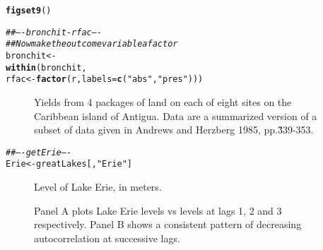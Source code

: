 \documentclass[12pt, a4paper,  BCOR=8.25mm, DIV=15]{scrartcl}\usepackage[]{graphicx}\usepackage[]{color}
\makeatletter
\newcommand{\hlstr}[1]{\textcolor[rgb]{0.192,0.494,0.8}{#1}}%
\newcommand{\hlcom}[1]{\textcolor[rgb]{0.678,0.584,0.686}{\textit{#1}}}%
\newcommand{\hlstd}[1]{\textcolor[rgb]{0.345,0.345,0.345}{#1}}%
\newcommand{\hlkwb}[1]{\textcolor[rgb]{0.69,0.353,0.396}{#1}}%
\newcommand{\hlkwc}[1]{\textcolor[rgb]{0.333,0.667,0.333}{#1}}%
\newcommand{\hlkwd}[1]{\textcolor[rgb]{0.737,0.353,0.396}{\textbf{#1}}}%
\newenvironment{kframe}{%
 \def\at@end@of@kframe{}%
 \ifinner\ifhmode%
  \def\at@end@of@kframe{\end{minipage}}%
  \begin{minipage}{\columnwidth}%
 \fi\fi%
 \def\FrameCommand##1{\hskip\@totalleftmargin \hskip-\fboxsep
 \colorbox{shadecolor}{##1}\hskip-\fboxsep
     \hskip-\linewidth \hskip-\@totalleftmargin \hskip\columnwidth}%
 \MakeFramed {\advance\hsize-\width
   \@totalleftmargin\z@ \linewidth\hsize
   \@setminipage}}%
 {\par\unskip\endMakeFramed%
 \at@end@of@kframe}
\newenvironment{knitrout}{}{} %
\makeatother
\begin{document}
\begin{knitrout}
\color{fgcolor}\begin{kframe}
\begin{alltt}
\hlkwd{figset9}\hlstd{()}
\end{alltt}


{\ttfamily\noindent\itshape\color{messagecolor}{\\Attaching package: 'DAAG'}}

{\ttfamily\noindent\itshape\color{messagecolor}{The following object is masked from 'package:MASS':

\ \ \ \ hills}}\begin{alltt}
  \hlcom{## ---- bronchit-rfac ----}
\hlcom{## Now make the outcome variable a factor}
\hlstd{bronchit} \hlkwb{<-}
  \hlkwd{within}\hlstd{(bronchit,}
         \hlstd{rfac} \hlkwb{<-} \hlkwd{factor}\hlstd{(r,} \hlkwc{labels}\hlstd{=}\hlkwd{c}\hlstd{(}\hlstr{"abs"}\hlstd{,}\hlstr{"pres"}\hlstd{)))}
\end{alltt}
\end{kframe}
\end{knitrout}

\begin{figure}

\caption{Yields from 4 packages of land on each of eight sites on the
  Caribbean island of Antigua. Data are a summarized version of a
  subset of data given in Andrews and Herzberg 1985,
  pp.\~339-353.\label{fig:caribbean}}
\end{figure}

\begin{knitrout}
\color{fgcolor}\begin{kframe}
\begin{alltt}
\hlcom{## ---- getErie ----}
\hlstd{Erie} \hlkwb{<-} \hlstd{greatLakes[,}\hlstr{"Erie"}\hlstd{]}
\end{alltt}
\end{kframe}
\end{knitrout}

\begin{figure}

\caption{Level of Lake Erie, in meters.
}\label{fig:erie}
\end{figure}

\begin{figure}

\vspace*{-3pt}


\caption{Panel A plots Lake Erie levels vs levels at lags 1, 2 and 3
  respectively. Panel B shows a consistent pattern of decreasing
  autocorrelation at successive lags.
}\label{erie-lagplot}
\end{figure}
\end{document}
